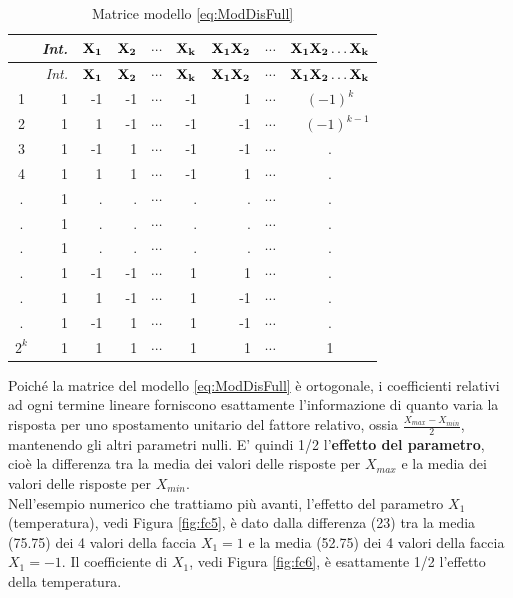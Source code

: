 \documentclass[
  11pt,
]{book}
\begin{document}
\begin{longtable}[]{@{}crrrrrrrc@{}}
\caption{\label{tab:MatrModDisFull} Matrice modello \eqref{eq:ModDisFull}}\tabularnewline
\toprule
& \emph{Int.} & \(\bf{X_1}\) & \(\bf{X_2}\) & \(\cdots\) & \(\bf{X_k}\) & \(\bf{X_1X_2}\) & \(\cdots\) & \(\bf{X_1X_2\dots X_k}\) \\
\midrule
\endfirsthead
\toprule
& \emph{Int.} & \(\bf{X_1}\) & \(\bf{X_2}\) & \(\cdots\) & \(\bf{X_k}\) & \(\bf{X_1X_2}\) & \(\cdots\) & \(\bf{X_1X_2\dots X_k}\) \\
\midrule
\endhead
1 & 1 & -1 & -1 & \(\cdots\) & -1 & 1 & \(\cdots\) & \((-1)^k\) \\
2 & 1 & 1 & -1 & \(\cdots\) & -1 & -1 & \(\cdots\) & \(\quad (-1)^{k-1}\) \\
3 & 1 & -1 & 1 & \(\cdots\) & -1 & -1 & \(\cdots\) & . \\
4 & 1 & 1 & 1 & \(\cdots\) & -1 & 1 & \(\cdots\) & . \\
. & 1 & . & . & \(\cdots\) & . & . & \(\cdots\) & . \\
. & 1 & . & . & \(\cdots\) & . & . & \(\cdots\) & . \\
. & 1 & . & . & \(\cdots\) & . & . & \(\cdots\) & . \\
. & 1 & -1 & -1 & \(\cdots\) & 1 & 1 & \(\cdots\) & . \\
. & 1 & 1 & -1 & \(\cdots\) & 1 & -1 & \(\cdots\) & . \\
. & 1 & -1 & 1 & \(\cdots\) & 1 & -1 & \(\cdots\) & . \\
\(2^k\) & 1 & 1 & 1 & \(\cdots\) & 1 & 1 & \(\cdots\) & 1 \\
\bottomrule
\end{longtable}

Poiché la matrice del modello \eqref{eq:ModDisFull} è ortogonale, i
coefficienti relativi ad ogni termine lineare forniscono esattamente
l'informazione di quanto varia la risposta per uno spostamento unitario
del fattore relativo, ossia \(\frac{X_{max}-X_{min}}{2}\), mantenendo gli
altri parametri nulli. E' quindi 1/2 l'\textbf{effetto del parametro},
cioè la differenza tra la media dei valori delle risposte per \(X_{max}\)
e la media dei valori delle risposte per \(X_{min}\).\\
Nell'esempio numerico che trattiamo più avanti, l'effetto del parametro
\(X_1\) (temperatura), vedi Figura \ref{fig:fc5}, è dato dalla differenza
(23) tra la media (75.75) dei 4 valori della faccia \(X_1=1\) e la media
(52.75) dei 4 valori della faccia \(X_1=-1\). Il coefficiente di \(X_1\),
vedi Figura \ref{fig:fc6}, è esattamente 1/2 l'effetto della temperatura.
\end{document}
